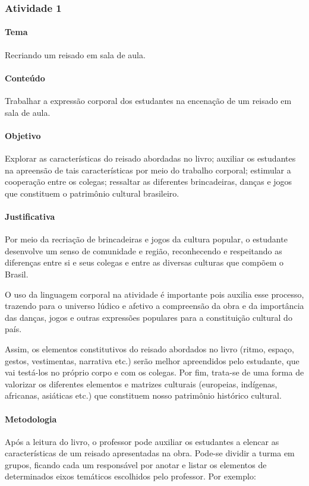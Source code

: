 \documentclass[11pt]{extarticle}
\begin{document}
\subsubsection{Atividade 1}

\paragraph{Tema} Recriando um reisado em sala de aula.

\paragraph{Conteúdo} Trabalhar a expressão corporal dos estudantes na encenação de um reisado em sala de aula.

\paragraph{Objetivo} Explorar as características do reisado abordadas no livro; auxiliar os estudantes na apreensão de tais características por meio do trabalho corporal; estimular a cooperação entre os colegas; ressaltar as diferentes brincadeiras, danças e jogos que constituem o patrimônio cultural brasileiro.

\paragraph{Justificativa} Por meio da recriação de brincadeiras e jogos da cultura popular, o estudante desenvolve um senso de comunidade e região, reconhecendo e respeitando as diferenças entre si e seus colegas e entre as diversas culturas que compõem o Brasil.

O uso da linguagem corporal na atividade é importante pois auxilia esse processo, trazendo para o universo lúdico e afetivo a compreensão da obra e da importância das danças, jogos e outras expressões populares para a constituição cultural do país.

Assim, os elementos constitutivos do reisado abordados no livro (ritmo, espaço, gestos, vestimentas, narrativa etc.) serão melhor apreendidos pelo estudante, que vai testá-los no próprio corpo e com os colegas. Por fim, trata-se de uma forma de valorizar os diferentes elementos e matrizes culturais (europeias, indígenas, africanas, asiáticas etc.) que constituem nosso patrimônio histórico cultural.

\paragraph{Metodologia} Após a leitura do livro, o professor pode auxiliar os estudantes a elencar as características de um reisado apresentadas na obra. Pode-se dividir a turma em grupos, ficando cada um responsável por anotar e listar os elementos de determinados eixos temáticos escolhidos pelo professor.
Por exemplo:
\end{document}
